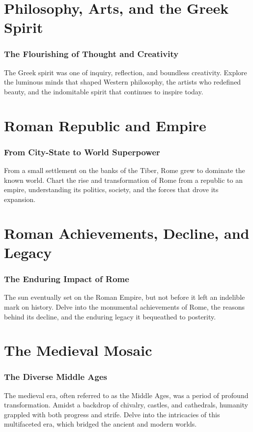 \documentclass[a4paper,12pt]{book}
\begin{document}
\chapter{Philosophy, Arts, and the Greek Spirit}
\subsection*{The Flourishing of Thought and Creativity}
The Greek spirit was one of inquiry, reflection, and boundless creativity. Explore the luminous minds that shaped Western philosophy, the artists who redefined beauty, and the indomitable spirit that continues to inspire today.

\chapter{Roman Republic and Empire}
\subsection*{From City-State to World Superpower}
From a small settlement on the banks of the Tiber, Rome grew to dominate the known world. Chart the rise and transformation of Rome from a republic to an empire, understanding its politics, society, and the forces that drove its expansion.

\chapter{Roman Achievements, Decline, and Legacy}
\subsection*{The Enduring Impact of Rome}
The sun eventually set on the Roman Empire, but not before it left an indelible mark on history. Delve into the monumental achievements of Rome, the reasons behind its decline, and the enduring legacy it bequeathed to posterity.

\chapter{The Medieval Mosaic}
\subsection*{The Diverse Middle Ages}
The medieval era, often referred to as the Middle Ages, was a period of profound transformation. Amidst a backdrop of chivalry, castles, and cathedrals, humanity grappled with both progress and strife. Delve into the intricacies of this multifaceted era, which bridged the ancient and modern worlds.
\end{document}
